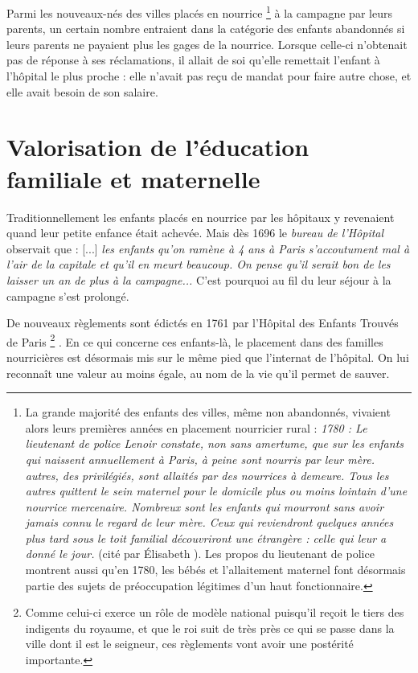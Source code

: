 Parmi les nouveaux-nés des villes placés en nourrice%
\footnote{La grande majorité des enfants des villes, même non abandonnés, vivaient alors leurs premières années en placement nourricier rural : \emph{1780 : Le lieutenant de police Lenoir constate, non sans amertume, que sur les  enfants qui naissent annuellement à Paris,  à peine sont nourris par leur mère.  autres, des privilégiés, sont allaités par des nourrices à demeure. Tous les autres quittent le sein maternel pour le domicile plus ou moins lointain d'une nourrice mercenaire. Nombreux sont les enfants qui mourront sans avoir jamais connu le regard de leur mère. Ceux qui reviendront quelques années plus tard sous le toit familial découvriront une étrangère : celle qui leur a donné le jour.} (cité par Élisabeth ). Les propos du lieutenant de police montrent aussi qu'en 1780, les bébés et l'allaitement maternel font désormais partie des sujets de préoccupation légitimes d'un haut fonctionnaire.} 
à la campagne par leurs parents, un certain nombre entraient dans la catégorie des enfants abandonnés si leurs parents ne payaient plus les gages de la nourrice. Lorsque celle-ci n'obtenait pas de réponse à ses réclamations, il allait de soi qu'elle remettait l'enfant à l'hôpital le plus proche : elle n'avait pas reçu de mandat pour faire autre chose, et elle avait besoin de son salaire. 


\section{Valorisation de l'éducation familiale et maternelle}

 Traditionnellement les enfants placés en nourrice par les hôpitaux y revenaient quand leur petite enfance était achevée. Mais dès 1696 le \emph{bureau de l'Hôpital} observait que : [...] \emph{les enfants qu'on ramène à 4 ans à Paris s'accoutument mal à l'air de la capitale et qu'il en meurt beaucoup. On pense qu'il serait bon de les laisser un an de plus à la campagne...} C'est pourquoi au fil du  leur séjour à la campagne s'est prolongé.

 De nouveaux règlements sont édictés en 1761 par l'Hôpital des Enfants Trouvés de Paris%
\footnote{Comme celui-ci exerce un rôle de modèle national puisqu'il reçoit le tiers des indigents du royaume, et que le roi suit de très près ce qui se passe dans la ville dont il est le seigneur, ces règlements vont avoir une postérité importante.}%
. En ce qui concerne ces enfants-là, le placement dans des familles nourricières est désormais mis sur le même pied que l'internat de l'hôpital. On lui reconnaît une valeur au moins égale, au nom de la vie qu'il permet de sauver. 

